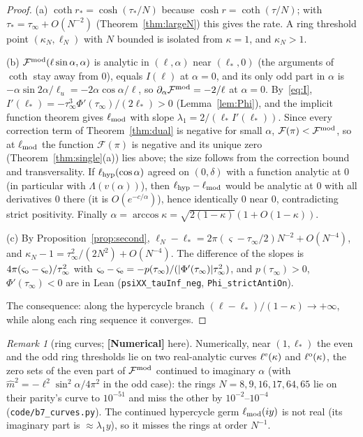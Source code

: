 \documentclass[11pt]{article}
\theoremstyle{definition}
\theoremstyle{remark}
\newtheorem{remark}[theorem]{Remark}
\newcommand{\st}[1]{\textbf{[#1]}}
\newcommand{\lean}[1]{\nolinkurl{#1}}
\begin{document}
\begin{proof}
(a) $\coth r_*=\cosh(\tau_*/N)$ because $\cosh r=\coth(\tau/N)$; with $\tau_*=\tau_\infty+O(N^{-2})$ (Theorem~\ref{thm:largeN}) this
gives the rate. A ring threshold point $(\kappa_N,\ell_N)$ with $N$ bounded is isolated from $\kappa=1$, and $\kappa_N>1$.

(b) $\mathcal F^{\rm mod}(\ell\sin\alpha,\alpha)$ is analytic in $(\ell,\alpha)$ near $(\ell_*,0)$ (the arguments of $\coth$ stay away from $0$),
equals $I(\ell)$ at $\alpha=0$, and its only odd part in $\alpha$ is $-\alpha\sin2\alpha/\ell_u=-2\alpha\cos\alpha/\ell$, so
$\partial_\alpha\mathcal F^{\rm mod}=-2/\ell$ at $\alpha=0$. By~\eqref{eq:I}, $I'(\ell_*)=-\tau_\infty^3\Phi'(\tau_\infty)/(2\ell_*)>0$
(Lemma~\ref{lem:Phi}), and the implicit function theorem gives $\ell_{\rm mod}$ with slope $\lambda_1=2/(\ell_*I'(\ell_*))$. Since every
correction term of Theorem~\ref{thm:dual} is negative for small $\alpha$, $\mathcal F(\pi)<\mathcal F^{\rm mod}$, so at $\ell_{\rm mod}$ the function
$\mathcal F(\pi)$ is negative and its unique zero (Theorem~\ref{thm:single}(a)) lies above; the size follows from the correction bound
and transversality. If $\ell_{\rm hyp}(\cos\alpha)$ agreed on $(0,\delta)$ with a function analytic at $0$ (in particular with $\Lambda(v(\alpha))$), then
$\ell_{\rm hyp}-\ell_{\rm mod}$ would be analytic at $0$ with all derivatives $0$ there (it is $O(e^{-c/\alpha})$), hence identically $0$
near $0$, contradicting strict positivity. Finally $\alpha=\arccos\kappa=\sqrt{2(1-\kappa)}(1+O(1-\kappa))$.

(c) By Proposition~\ref{prop:second}, $\ell_N-\ell_*=2\pi(\varsigma-\tau_\infty/2)N^{-2}+O(N^{-4})$, and $\kappa_N-1=\tau_\infty^2/(2N^2)+O(N^{-4})$.
The difference of the slopes is $4\pi(\varsigma_{\rm o}-\varsigma_{\rm e})/\tau_\infty^2$ with $\varsigma_{\rm o}-\varsigma_{\rm e}=-p(\tau_\infty)/(|\Phi'(\tau_\infty)|\tau_\infty^2)$, and
$p(\tau_\infty)>0$, $\Phi'(\tau_\infty)<0$ are in Lean (\lean{psiXX_tauInf_neg}, \lean{Phi_strictAntiOn}).

The consequence: along the hypercycle branch $(\ell-\ell_*)/(1-\kappa)\to+\infty$, while along each ring sequence it converges.
\end{proof}

\begin{remark}[ring curves; \st{Numerical} here]\label{rem:ringcurves}
Numerically, near $(1,\ell_*)$ the even and the odd ring thresholds lie on two real-analytic curves $\ell^{\rm e}(\kappa)$
and $\ell^{\rm o}(\kappa)$, the zero sets of the even part of $\mathcal F^{\rm mod}$ continued to imaginary $\alpha$ (with
$\hat m^2=-\ell^2\sin^2\alpha/4\pi^2$ in the odd case): the rings $N=8,9,16,17,64,65$ lie on their parity's curve to $10^{-51}$ and miss the other by $10^{-2}$--$10^{-4}$
(\nolinkurl{code/b7_curves.py}). The continued hypercycle germ $\ell_{\rm mod}(iy)$ is not real (its imaginary part is
$\approx\lambda_1 y$), so it misses the rings at order $N^{-1}$.
\end{remark}
\end{document}
